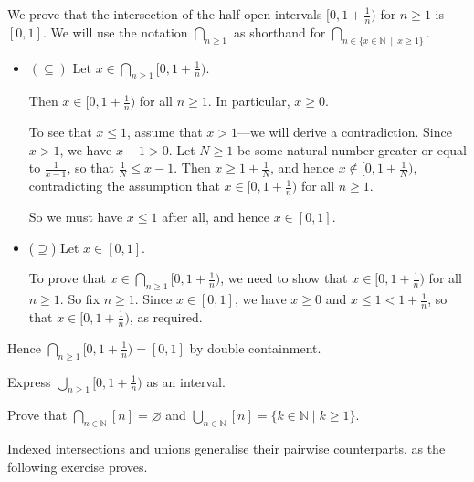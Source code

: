 \begin{example}
\label{exIndexedIntersectionOfHalfOpenIntervals}
We prove that the intersection of the half-open intervals $[0,1+\frac{1}{n})$ for $n \ge 1$ is $[0,1]$. We will use the notation $\displaystyle \bigcap_{n \ge 1}$ as shorthand for $\displaystyle \bigcap_{n \in \{ x \in \mathbb{N} ~\mid~ x \ge 1 \}}$.

\begin{itemize}
\item $(\subseteq)$ Let $x \in \displaystyle\bigcap_{n \ge 1} [0,1+\frac{1}{n})$.

Then $x \in [0,1+\frac{1}{n})$ for all $n \ge 1$. In particular, $x \ge 0$.

To see that $x \le 1$, assume that $x>1$---we will derive a contradiction. Since $x>1$, we have $x-1 > 0$. Let $N \ge 1$ be some natural number greater or equal to $\frac{1}{x-1}$, so that $\frac{1}{N} \le x-1$. Then $x \ge 1 + \frac{1}{N}$, and hence $x \not\in [0,1+\frac{1}{N})$, contradicting the assumption that $x \in [0,1+\frac{1}{n})$ for all $n \ge 1$.

So we must have $x \le 1$ after all, and hence $x \in [0,1]$.

\item ($\supseteq$) Let $x \in [0,1]$.

To prove that $x \in \displaystyle \bigcap_{n \ge 1} [0,1+\frac{1}{n})$, we need to show that $x \in [0,1+\frac{1}{n})$ for all $n \ge 1$. So fix $n \ge 1$. Since $x \in [0,1]$, we have $x \ge 0$ and $x \le 1 < 1+\frac{1}{n}$, so that $x \in [0,1+\frac{1}{n})$, as required.
\end{itemize}

Hence $\displaystyle\bigcap_{n \ge 1} [0,1+\frac{1}{n}) = [0,1]$ by double containment.
\end{example}

\begin{exercise}
Express $\displaystyle\bigcup_{n \ge 1} [0,1+\frac{1}{n})$ as an interval.
\end{exercise}

\begin{exercise}
Prove that $\displaystyle\bigcap_{n \in \mathbb{N}} [n] = \varnothing$ and $\displaystyle\bigcup_{n \in \mathbb{N}} [n] = \{ k \in \mathbb{N} \mid k \ge 1 \}$.
\end{exercise}

Indexed intersections and unions generalise their pairwise counterparts, as the following exercise proves.

